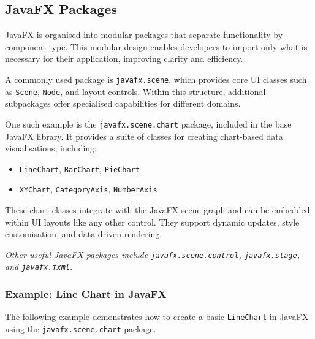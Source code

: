 \documentclass{article}
\newcommand{\codecmd}[1]{\textcolor[rgb]{0,0.5,0}{\texttt{#1}}}
\begin{document}
\subsection{JavaFX Packages}

JavaFX is organised into modular packages that separate functionality by component type. This modular design enables developers to import only what is necessary for their application, improving clarity and efficiency.

A commonly used package is \codecmd{javafx.scene}, which provides core UI classes such as \codecmd{Scene}, \codecmd{Node}, and layout controls. Within this structure, additional subpackages offer specialised capabilities for different domains.

One such example is the \codecmd{javafx.scene.chart} package, included in the base JavaFX library. It provides a suite of classes for creating chart-based data visualisations, including:

\begin{itemize}
    \item \codecmd{LineChart}, \codecmd{BarChart}, \codecmd{PieChart}
    \item \codecmd{XYChart}, \codecmd{CategoryAxis}, \codecmd{NumberAxis}
\end{itemize}

These chart classes integrate with the JavaFX scene graph and can be embedded within UI layouts like any other control. They support dynamic updates, style customisation, and data-driven rendering.

\medskip
\textit{Other useful JavaFX packages include \codecmd{javafx.scene.control}, \codecmd{javafx.stage}, and \codecmd{javafx.fxml}.}

\subsubsection{Example: Line Chart in JavaFX}

The following example demonstrates how to create a basic \codecmd{LineChart} in JavaFX using the \codecmd{javafx.scene.chart} package.
\end{document}
